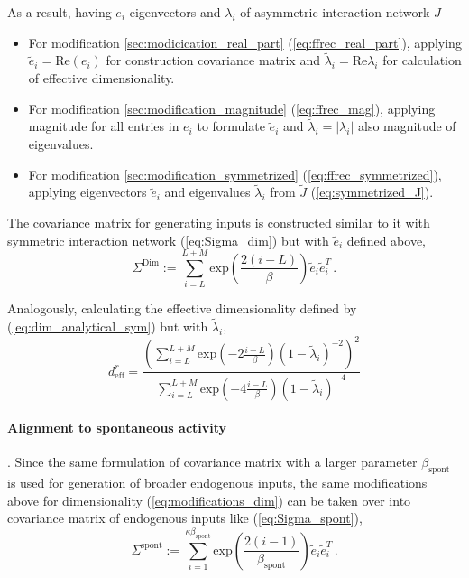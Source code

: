 \documentclass[11pt]{article}
\begin{document}
	As a result, having $e_i$ eigenvectors and $\lambda_i$ of asymmetric interaction network $J$
	  \begin{itemize}
			  	\item For modification \ref{sec:modicication_real_part} (\ref{eq:ffrec_real_part}), applying $\tilde{e}_i = \text{Re}(e_i)$ for construction covariance matrix and $\tilde{\lambda}_i = \text{Re}\lambda_i$ for calculation of effective dimensionality. 
			  	\item For modification \ref{sec:modification_magnitude} (\ref{eq:ffrec_mag}), applying magnitude for all entries in $e_i$ to formulate $\tilde{e}_i$ and $\tilde{\lambda}_i = \vert \lambda_i \vert$ also magnitude of eigenvalues. 
			  	\item For modification \ref{sec:modification_symmetrized} (\ref{eq:ffrec_symmetrized}), applying eigenvectors $\tilde{e}_i$ and eigenvalues $\tilde{\lambda}_i$ from $\tilde{J}$ (\ref{eq:symmetrized_J}).
	  \end{itemize}
			  		
  	 The covariance matrix for generating inputs is constructed similar to it with symmetric interaction network (\ref{eq:Sigma_dim}) but with $\tilde{e}_i$ defined above, 
  	  	\begin{equation} \label{eq:modifications_dim}
  	  		\Sigma^{\text{Dim}} := \sum_{i=L}^{L+M} \text{exp}\left(\frac{2(i-L)}{\beta}\right) \tilde{e}_i \tilde{e}_i^T \, .
  	  	\end{equation}
		  	  	
 	  Analogously, calculating the effective dimensionality defined by (\ref{eq:dim_analytical_sym}) but with $\tilde{\lambda}_i$,
  	  	  	\begin{equation} \label{eq:modification_eff_dim}
  	  	  		d^r_{\text{eff}} = \frac{\left(\sum_{i = L}^{L + M} \text{exp}\left(-2 \frac{i-L}{\beta}\right)(1-\tilde{\lambda}_i)^{-2}\right)^2}{\sum_{i=L}^{L+M} \text{exp}\left(-4 \frac{i-L}{\beta}\right)(1-\tilde{\lambda}_i)^{-4}}
  	  	  	\end{equation}
		  	  	
	\paragraph{Alignment to spontaneous activity}. %
	Since the same formulation of covariance matrix with a larger parameter $\beta_{\text{spont}}$ is used for generation of broader endogenous inputs, the same modifications above for dimensionality (\ref{eq:modifications_dim}) can be taken over into covariance matrix of endogenous inputs like (\ref{eq:Sigma_spont}),
	  	\begin{equation} \label{eq:Sigma_spont_asym}
	  		\Sigma^{\text{spont}} := \sum_{i=1}^{\kappa\beta_{\text{spont}}} 		\text{exp}\left(\frac{2(i-1)}{\beta_{\text{spont}}}\right) \tilde{e}_i \tilde{e}_i^T \, .
	  	\end{equation}
				  
\end{document}
